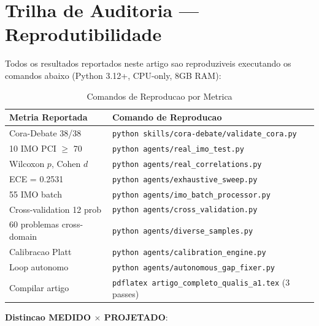 \documentclass[5p]{elsarticle}
\newcommand{\tabfootnotesize}{\fontsize{9}{11}\selectfont}
\begin{document}
\section{Trilha de Auditoria — Reprodutibilidade}

Todos os resultados reportados neste artigo sao reproduziveis executando
os comandos abaixo (Python 3.12+, CPU-only, 8GB RAM):

\begin{table}[H]
\centering
\caption{Comandos de Reproducao por Metrica}
\label{tab:auditoria}
\tabfootnotesize
\begin{tabular}{p{5cm} p{7cm}}
\toprule
\textbf{Metria Reportada} & \textbf{Comando de Reproducao}\\
\midrule
Cora-Debate 38/38 & \texttt{python skills/cora-debate/validate\_cora.py}\\
10 IMO PCI $\geq$ 70 & \texttt{python agents/real\_imo\_test.py}\\
Wilcoxon $p$, Cohen $d$ & \texttt{python agents/real\_correlations.py}\\
ECE = 0.2531 & \texttt{python agents/exhaustive\_sweep.py}\\
55 IMO batch & \texttt{python agents/imo\_batch\_processor.py}\\
Cross-validation 12 prob & \texttt{python agents/cross\_validation.py}\\
60 problemas cross-domain & \texttt{python agents/diverse\_samples.py}\\
Calibracao Platt & \texttt{python agents/calibration\_engine.py}\\
Loop autonomo & \texttt{python agents/autonomous\_gap\_fixer.py}\\
Compilar artigo & \texttt{pdflatex artigo\_completo\_qualis\_a1.tex} (3 passes)\\
\bottomrule
\end{tabular}
\end{table}

\textbf{Distincao MEDIDO $\times$ PROJETADO}:
\end{document}
